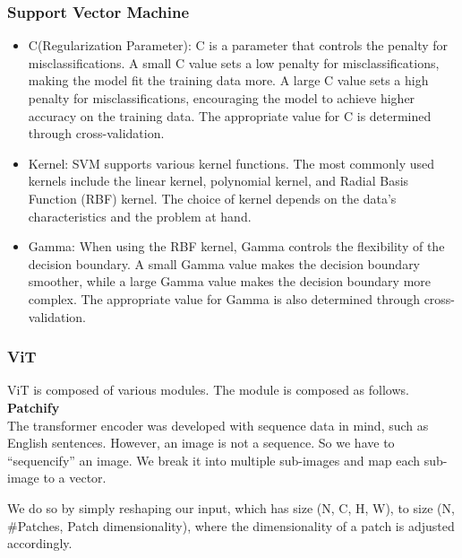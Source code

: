 \subsubsection{\textbf{Support Vector Machine}}
\begin{itemize}
    \item C(Regularization Parameter): C is a parameter that controls the penalty for misclassifications. A small C value sets a low penalty for misclassifications, making the model fit the training data more. A large C value sets a high penalty for misclassifications, encouraging the model to achieve higher accuracy on the training data. The appropriate value for C is determined through cross-validation.
    \item Kernel: SVM supports various kernel functions. The most commonly used kernels include the linear kernel, polynomial kernel, and Radial Basis Function (RBF) kernel. The choice of kernel depends on the data's characteristics and the problem at hand.
    \item Gamma: When using the RBF kernel, Gamma controls the flexibility of the decision boundary. A small Gamma value makes the decision boundary smoother, while a large Gamma value makes the decision boundary more complex. The appropriate value for Gamma is also determined through cross-validation.
\end{itemize}

\subsubsection{\textbf{ViT}}
\cite{vision-transformers-medium}
ViT is composed of various modules. The module is composed as follows.\\

\textbf{Patchify} \\
The transformer encoder was developed with sequence data in mind, such as English sentences. However, an image is not a sequence. So we have to “sequencify” an image. We break it into multiple sub-images and map each sub-image to a vector.

We do so by simply reshaping our input, which has size (N, C, H, W), to size (N, \#Patches, Patch dimensionality), where the dimensionality of a patch is adjusted accordingly.\\

